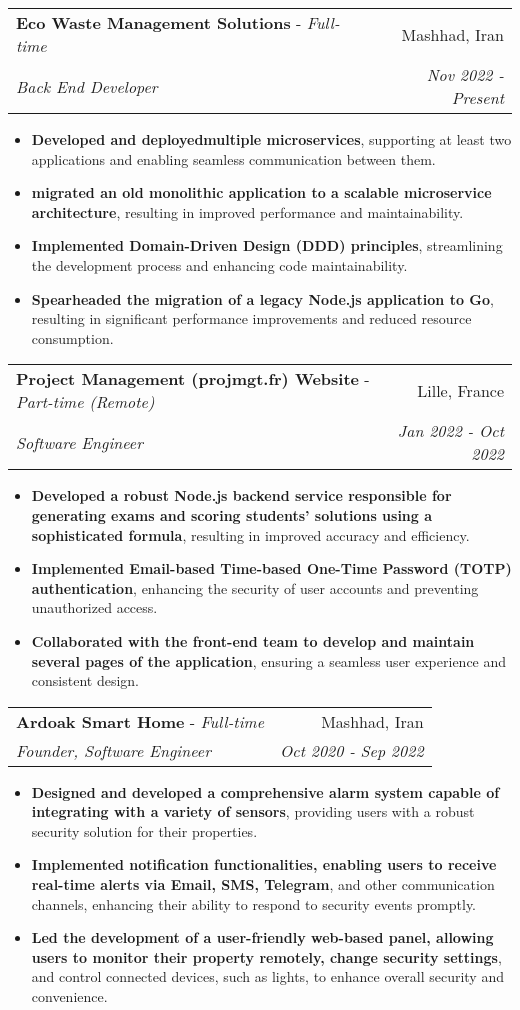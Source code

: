 \documentclass[letterpaper,11pt]{article}
\makeatletter
\newcommand{\resumeDescription}[2]{
  \item\small{
    \textbf{#1}{#2 \vspace{-2pt}}
  }
}
\newcommand{\resumeExerienceItem}[5]{
  \vspace{-1pt}\item
    \begin{tabular*}{0.97\textwidth}[t]{l@{\extracolsep{\fill}}r}
      \textbf{#1} - \textit{\small#2} & #3 \\
      \textit{\small#4} & \textit{\small #5} \\
    \end{tabular*}\vspace{-5pt}
}
\newcommand{\resumeExperienceItemDescription}[2]{\resumeDescription{#1}{#2}}
\newcommand{\resumeItemListStart}{\begin{itemize}}
\newcommand{\resumeItemListEnd}{\end{itemize}\vspace{-5pt}}
\makeatother
\begin{document}
    \resumeExerienceItem
    {Eco Waste Management Solutions}{Full-time}{Mashhad, Iran}
    {Back End Developer}{Nov 2022 - Present}
    \resumeItemListStart
      \resumeExperienceItemDescription{Developed and deployedmultiple microservices}
        {, supporting at least two applications and enabling seamless communication between them.}
      \resumeExperienceItemDescription{migrated an old monolithic application to a scalable microservice architecture}
        {, resulting in improved performance and maintainability.}
      \resumeExperienceItemDescription{Implemented Domain-Driven Design (DDD) principles}{, streamlining the development process and enhancing code maintainability.}
      \resumeExperienceItemDescription{Spearheaded the migration of a legacy Node.js application to Go}{, resulting in significant performance improvements and reduced resource consumption.}
    \resumeItemListEnd

    \resumeExerienceItem
    {Project Management (projmgt.fr) Website}{Part-time (Remote)}{Lille, France}
    {Software Engineer}{Jan 2022 - Oct 2022}
    \resumeItemListStart
      \resumeExperienceItemDescription{Developed a robust Node.js backend service responsible for generating exams and scoring students' solutions using a sophisticated formula}
        {, resulting in improved accuracy and efficiency.}
      \resumeExperienceItemDescription{Implemented Email-based Time-based One-Time Password (TOTP) authentication}
        {, enhancing the security of user accounts and preventing unauthorized access.}
      \resumeExperienceItemDescription{Collaborated with the front-end team to develop and maintain several pages of the application}{, ensuring a seamless user experience and consistent design.}
    \resumeItemListEnd

    \resumeExerienceItem
    {Ardoak Smart Home}{Full-time}{Mashhad, Iran}
    {Founder, Software Engineer}{Oct 2020 - Sep 2022}
    \resumeItemListStart
      \resumeExperienceItemDescription{Designed and developed a comprehensive alarm system capable of integrating with a variety of sensors}
        {, providing users with a robust security solution for their properties.}
      \resumeExperienceItemDescription{Implemented notification functionalities, enabling users to receive real-time alerts via Email, SMS, Telegram}
        {, and other communication channels, enhancing their ability to respond to security events promptly.}
      \resumeExperienceItemDescription{Led the development of a user-friendly web-based panel, allowing users to monitor their property remotely, change security settings}
      {, and control connected devices, such as lights, to enhance overall security and convenience.}
    \resumeItemListEnd
\end{document}
